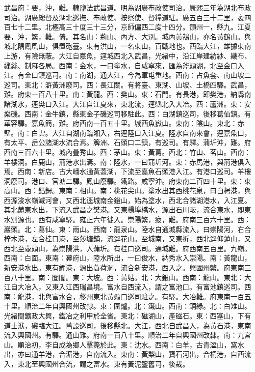 \begin{pinyinscope}
武昌府：要，沖，難。隸鹽法武昌道。明為湖廣布政使司治。康熙三年為湖北布政司治。湖廣總督及湖北巡撫、布政使、按察使、督糧道駐。廣五百三十二里，袤四百七十二里。北極高三十度三十三分，京師偏西二度十四分。領州一，縣九。江夏要，沖，繁，難。倚。其名山：荊山、內方、大別。城內黃鵠山，亦名黃鶴山。與城北隅鳳凰山，俱置砲臺。東有洪山，一名東山，百戰地也。西臨大江，雄據東南上游，有險無蔽。大江自嘉魚，逕城西北入武昌，光緒中，沿江岸建紡紗、織布、繅絲、制麻各局。西南：金水，一曰塗水，自咸寧來，匯為斧頭湖，北至金口入江。有金口鎮巡司。南：南湖，通大江，今為軍屯重地。西南：占魚套、南山坡二巡司。東北：滸黃洲廢司。西：長江關。有將臺、東湖、山坡、土橋四驛。武昌，難。府東一百八十里。南：黃龍。西：樊山。東：石門。有長港，即樊港，納縣南諸湖水，逕樊口入江。大江自江夏來，東北流，逕縣北入大冶。西：蘆洲。東：安樂磯。西南：金牛鎮，縣東金子磯巡司移駐此。西：白湖鎮巡司，後移葛仙鎮。有華容驛。嘉魚簡，難。府西南一百五十里。城西魚嶽山。東南：陰山。東北：赤壁。南：白雲。大江自湖南臨湘入，右逕陸口入江夏。陸水自南來會，逕嘉魚口，有太平、岳公諸湖水流合焉。簰洲、石頭口二鎮，有巡司。有驛。蒲圻沖，難。府西南三百六十里。城內疊秀山。西：茅山。東：黃葛。西北：竹山、茗山。西南：羊樓洞。白鹿山，荊港水出焉。南：陸水，一曰蒲圻河。東：赤馬港，與荊港俱入焉。西南：新店。古大嶓水通黃蓋湖，下流至嘉魚石頭港入江。有港口巡司。羊樓洞廢司。港口、官塘二驛。鳳山廢驛。鐵路。咸寧沖。府東南二百四十里。東：東高山。西：鈷鉧。東南：相山。南：桃花尖山。塗水出其西桃花泉，曰白枵港，與西源浚水嶺減河會，又西北逕城南金鐙山，始為塗水，西北合諸湖港水，入江夏。其北麓東水出，下流入武昌之樊港。又東楊埠橋水，源出石川畈，流合東水，即東水別源也。西有咸寧驛。雍正六年徙入。崇陽繁，疲，難。府南三百六十里。西：巖頭。北：葛仙。東：雨山。西南：龍泉山。陸水自通城縣流入，曰崇陽河，右合梓木港，左合桂口港，至莎塘鋪，流逕花山。至城南，又東折，西北逕仰蓮山，又西北至壺頭山，為崇陽洪，入蒲圻。有桂口巡司。通城難。府西南五百里。九嶺。西南：白面。東南：幕府山，陸水所出，一曰俊水，納秀水入崇陽。南：黃龍山，新安港水出。東有鯉港，源出蓑荷洞，流合新安港，西入之。興國州繁。府東南三百八十里。南：闔閭。東：大坡。西：黃姑。北：大銀山。西南：龍山。東北：大江自大冶入，又東入江西瑞昌境。富水自西流入，謂之富池口。有富池鎮巡司。西南：龍港，北與富水合，移州東北黃顙口巡司駐之。有驛。大冶難。府東南一百五十里。順治二年自興國州改隸。東：圍爐。北：鐵山。西南：銅綠。北：白雉山。光緒間鑛政大興，鐵冶之利甲於全省。東北：磁湖山，產磁石。東：西塞山，下有道士洑，磯臨大江。舊設巡司，後移縣北。大江，西北自武昌入，為黃石港，東南流入興國州。有驛。通山難。府南一百八十里。順治二年自興國州改隸。南：九宮山。順治初，李自成為鄉人擊斃於此。東：沈水。西南：白羊，古青湓山，窩水出，亦曰通羊港，合湄港，自南流入。東南：黃梨山，寶石河出，合桐港，自西流入，東北至興國州合流，謂之富水。東有黃泥壟舊司，後裁。


\end{pinyinscope}
